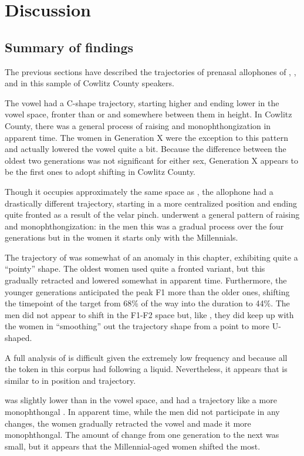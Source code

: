 \section{Discussion}
\label{sec:prenasal_discussion}

\subsection{Summary of findings}

The previous sections have described the trajectories of prenasal allophones of \trap, \dress, and \kit in this sample of Cowlitz County speakers.

The \ban vowel had a C-shape trajectory, starting higher and ending lower in the vowel space, fronter than \bat or \bet and somewhere between them in height. In Cowlitz County, there was a general process of raising and monophthongization in apparent time. The women in Generation X were the exception to this pattern and actually lowered the vowel quite a bit. Because the difference between the oldest two generations was not significant for either sex, Generation X appears to be the first ones to adopt \ban shifting in Cowlitz County.

Though it occupies approximately the same space as \ban, the \bang allophone had a drastically different trajectory, starting in a more centralized position and ending quite fronted as a result of the velar pinch. \bang underwent a general pattern of raising and monophthongization: in the men this was a gradual process over the four generations but in the women it starts only with the Millennials.

The trajectory of \ben was somewhat of an anomaly in this chapter, exhibiting quite a ``pointy'' shape. The oldest women used quite a fronted variant, but this gradually retracted and lowered somewhat in apparent time. Furthermore, the younger generations anticipated the peak F1 more than the older ones, shifting the timepoint of the target from 68\% of the way into the duration to 44\%. The men did not appear to shift \ben in the F1-F2 space but, like \bet, they did keep up with the women in ``smoothing'' out the trajectory shape from a point to more U-shaped.

A full analysis of \beng is difficult given the extremely low frequency and because all the token in this corpus had \beng following a liquid. Nevertheless, it appears that \beng is similar to \bang in position and trajectory.

\bin was slightly lower than \bit in the vowel space, and had a trajectory like a more monophthongal \ban. In apparent time, while the men did not participate in any changes, the women gradually retracted the vowel and made it more monophthongal. The amount of change from one generation to the next was small, but it appears that the Millennial-aged women shifted the most.

